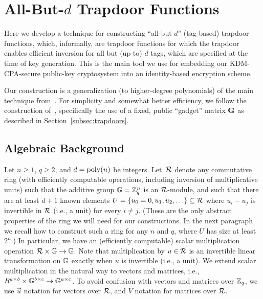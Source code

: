 
\section{All-But-$d$ Trapdoor Functions}
\label{sec:all-but-d}

Here we develop a technique for constructing ``all-but-$d$''
(tag-based) trapdoor functions, which, informally, are trapdoor
functions for which the trapdoor enables efficient inversion for all
but (up to) $d$ tags, which are specified at the time of key
generation.  This is the main tool we use for embedding our
KDM-CPA-secure public-key cryptosystem into an identity-based
encryption scheme.

Our construction is a generalization (to higher-degree polynomials) of
the main technique from~\cite{DBLP:conf/eurocrypt/AgrawalBB10}.  For
simplicity and somewhat better efficiency, we follow the construction
of~\cite{DBLP:conf/eurocrypt/MicciancioP12}, specifically the use of a
fixed, public ``gadget'' matrix $\mathbf{G}$ as described in
Section~\ref{subsec:trapdoors}.

\subsection{Algebraic Background}

Let $n \geq 1$, $q \geq 2$, and $d = \operatorname{poly}(n)$
be integers.  Let~$\mathcal{R}$ denote any commutative ring (with
efficiently computable operations, including inversion of
multiplicative units) such that the additive group $\mathbb{G}=\mathbb{Z}_q^{n}$ is an
$\mathcal{R}$-module, and such that there are at least $d+1$ known elements
$U = \{{u_{0}=0, u_{1}, u_{2}, \ldots}\} \subseteq \mathcal{R}$ where
$u_{i}-u_{j}$ is invertible in $\mathcal{R}$ (i.e., a unit) for every $i
\neq j$.  \iflncs \else (These are the only abstract properties of the
ring we will need for our constructions.  In the next paragraph we
recall how to construct such a ring for any $n$ and $q$, where $U$ has
size at least $2^{n}$.)  \fi In particular, we have an (efficiently
computable) scalar multiplication operation $\mathcal{R} \times \mathbb{G} \to \mathbb{G}$.
Note that multiplication by $u \in \mathcal{R}$ is an invertible linear
transformation on $\mathbb{G}$ exactly when $u$ is invertible (i.e., a unit).
We extend scalar multiplication in the natural way to vectors and
matrices, i.e., $R^{a \times b} \times \mathbb{G}^{b \times c} \to \mathbb{G}^{a
  \times c}$.  To avoid confusion with vectors and matrices over
$\mathbb{Z}_q$, we use $\vec{u}$ notation for vectors over $\mathcal{R}$, and $V$
notation for matrices over $\mathcal{R}$.

